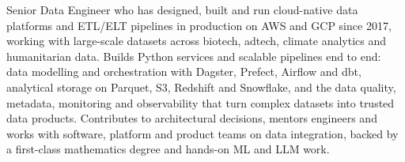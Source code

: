 
\begin{cvparagraph}

Senior Data Engineer who has designed, built and run cloud-native data platforms and ETL/ELT pipelines in production on AWS and GCP since 2017, working with large-scale datasets across biotech, adtech, climate analytics and humanitarian data. Builds Python services and scalable pipelines end to end: data modelling and orchestration with Dagster, Prefect, Airflow and dbt, analytical storage on Parquet, S3, Redshift and Snowflake, and the data quality, metadata, monitoring and observability that turn complex datasets into trusted data products. Contributes to architectural decisions, mentors engineers and works with software, platform and product teams on data integration, backed by a first-class mathematics degree and hands-on ML and LLM work.

\end{cvparagraph}
